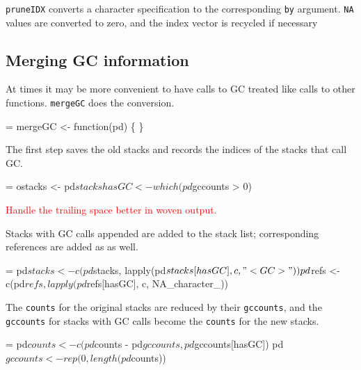 \documentclass[11pt]{article}
\newcommand{\FIXME}[1]{\textcolor{red}{#1}}
\begin{document}
\Verb!pruneIDX! converts a character specification to the corresponding
\Verb!by! argument. \Verb?NA? values are converted to zero, and the index
vector is recycled if necessary

\subsection{Merging GC information}
At times it may be more convenient to have calls to GC treated like
calls to other functions. \Verb!mergeGC! does the conversion.
\begin{nwchunk}
=
 mergeGC <- function(pd) \{
 \}
\end{nwchunk}

The first step saves the old stacks and records the indices of the
stacks that call GC.
\begin{nwchunk}
=
 ostacks <- pd$stacks
 hasGC <- which(pd$gccounts > 0)
 
\end{nwchunk}
\FIXME{Handle the trailing space better in woven output.}

Stacks with GC calls appended are added to the stack list;
corresponding references are added as as well.
\begin{nwchunk}
=
 pd$stacks <- c(pd$stacks, lapply(pd$stacks[hasGC], c, "<GC>"))
 pd$refs <- c(pd$refs, lapply(pd$refs[hasGC], c, NA_character_))
\end{nwchunk}

The \Verb!counts! for the original stacks are reduced by their
\Verb!gccounts!, and the \Verb?gccounts? for stacks with GC calls become the
\Verb!counts! for the new stacks.
\begin{nwchunk}
=
 pd$counts <- c(pd$counts - pd$gccounts, pd$gccounts[hasGC])
 pd$gccounts <- rep(0, length(pd$counts))
 
\end{nwchunk}
\end{document}
